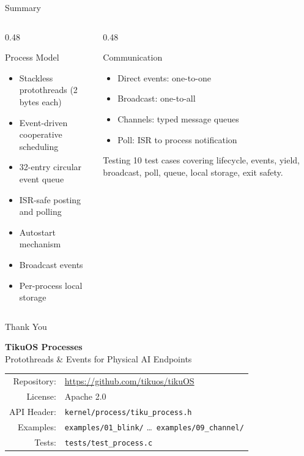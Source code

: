 \documentclass[aspectratio=169, 10pt]{beamer}
\begin{document}
\begin{frame}{Summary}
\begin{columns}[T]
\begin{column}{0.48\textwidth}
\begin{block}{Process Model}
\begin{itemize}
  \item Stackless protothreads (2 bytes each)
  \item Event-driven cooperative scheduling
  \item 32-entry circular event queue
  \item ISR-safe posting and polling
  \item Autostart mechanism
  \item Broadcast events
  \item Per-process local storage
\end{itemize}
\end{block}
\end{column}

\begin{column}{0.48\textwidth}
\begin{block}{Communication}
\begin{itemize}
  \item Direct events: one-to-one
  \item Broadcast: one-to-all
  \item Channels: typed message queues
  \item Poll: ISR to process notification
\end{itemize}
\end{block}

\vspace{0.3em}
\begin{block}{Testing}
10 test cases covering lifecycle, events, yield,
broadcast, poll, queue, local storage, exit safety.
\end{block}
\end{column}
\end{columns}
\end{frame}

\begin{frame}{Thank You}
\begin{center}
\Large\textbf{TikuOS Processes}\\[0.5em]
\normalsize Protothreads \& Events for Physical AI Endpoints\\[1.5em]

\begin{tabular}{rl}
  Repository: & \url{https://github.com/tikuos/tikuOS} \\
  License:    & Apache 2.0 \\
  API Header: & \texttt{kernel/process/tiku\_process.h} \\
  Examples:   & \texttt{examples/01\_blink/} \ldots\ \texttt{examples/09\_channel/} \\
  Tests:      & \texttt{tests/test\_process.c} \\
\end{tabular}
\end{center}
\end{frame}
\end{document}
